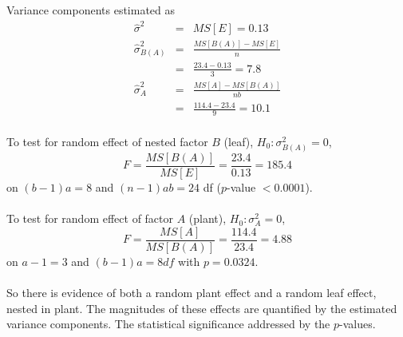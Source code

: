 Variance components estimated as
\begin{eqnarray*}
\hat\sigma^2 & = & MS[E]  =  0.13 \\
\hat\sigma_{B(A)}^2 & = & \frac{MS[B(A)]-MS[E]}{n} \\
& = & \frac{23.4-0.13}{3}  =  7.8  \\
\hat\sigma_{A}^2 & = & \frac{MS[A]-MS[B(A)]}{nb} \\
& = & \frac{114.4-23.4}{9}  =  10.1
\end{eqnarray*}
~\\
To test for random effect of nested factor $B$ (leaf), $H_0: \sigma_{B(A)}^2=0$,
$$ F=\frac{MS[B(A)]}{MS[E]}=\frac{23.4}{0.13}=185.4$$ 
on $(b-1)a=8$ and $(n-1)ab=24$ df  ($p$-value $<0.0001$).\\~\\

To test for random effect of factor $A$ (plant), $H_0: \sigma_A^2=0$, 
$$ F=\frac{MS[A]}{MS[B(A)]} = \frac{114.4}{23.4} = 4.88$$
on $a-1=3$ and $(b-1)a=8 df$ with $p=0.0324$.   \\~\\

So there is evidence of both a random plant effect and a random leaf effect, nested in plant.  The magnitudes of these effects are quantified by the estimated variance components.  The statistical significance addressed by the $p$-values.  \\~\\~\\

